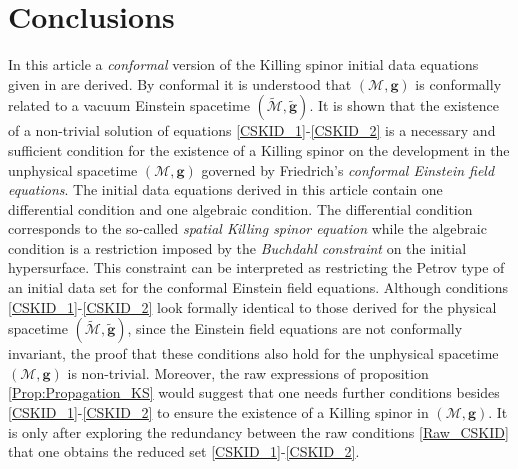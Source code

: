 \documentclass[10pt,a4paper]{article}
\theoremstyle{plain}
\def\bmg{{\bm g}}
\begin{document}
\section*{Conclusions}

In this article a \emph{conformal} version of the Killing spinor
initial data equations given in \cite{GarVal08c} are derived. By
conformal it is understood that $(\mathcal{M},\bmg)$ is conformally
related to a vacuum Einstein spacetime $(\tilde{\mathcal{M}},\tilde{\bmg})$.
It is shown that the existence of a non-trivial solution of equations
\eqref{CSKID_1}-\eqref{CSKID_2} is a necessary and sufficient
condition for the existence of a Killing spinor on the development in
the unphysical spacetime $(\mathcal{M},\bmg)$ governed by Friedrich's
\emph{conformal Einstein field equations}.
  The initial data equations derived in this article contain one differential condition and one
  algebraic condition.  The differential condition corresponds to the
  so-called \emph{spatial Killing spinor equation} while the algebraic
  condition is a restriction imposed by the \emph{Buchdahl constraint} on the initial
  hypersurface. This constraint can be interpreted as restricting the Petrov type
  of an initial data set for the conformal Einstein field equations.
  Although conditions \eqref{CSKID_1}-\eqref{CSKID_2} look formally
  identical to those derived for the physical spacetime
  $(\tilde{\mathcal{M}},\tilde{\bmg})$, since the Einstein field
  equations are not conformally invariant, the proof that these
  conditions also hold for the unphysical spacetime
  $(\mathcal{M},\bmg)$ is non-trivial.  Moreover, the raw expressions
  of proposition \ref{Prop:Propagation_KS} would suggest that one
  needs further conditions besides \eqref{CSKID_1}-\eqref{CSKID_2} to
  ensure the existence of a Killing spinor in $(\mathcal{M},\bmg)$. It
  is only after exploring the redundancy between the raw conditions
  \eqref{Raw_CSKID} that one obtains the reduced set
  \eqref{CSKID_1}-\eqref{CSKID_2}.

  \medskip
\end{document}
